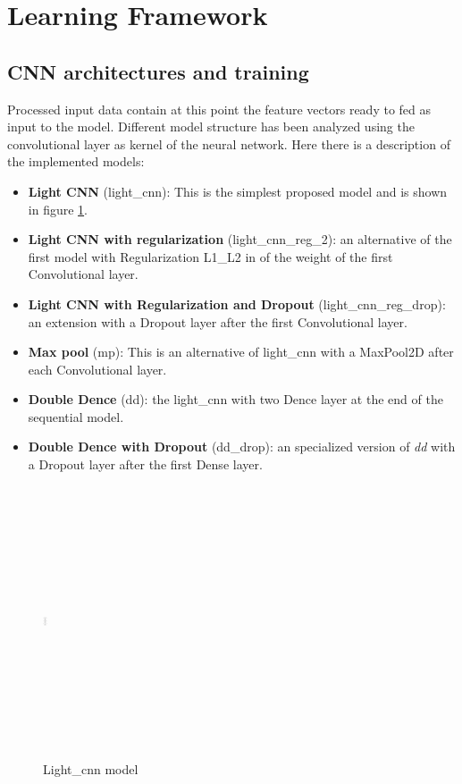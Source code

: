 \section{Learning Framework}
\label{sec:learning_framework}

\subsection*{\textbf {CNN architectures and training}}Processed input data contain at this point the feature vectors ready to fed as input to the model. Different model structure has been analyzed using the convolutional layer as kernel of the neural network. Here there is a description of the implemented models:
\begin{itemize}
	\item \textbf{Light CNN} (light\_cnn): This is the simplest proposed model and is shown in figure \ref{fig:CNN_schema}.
	\item \textbf{Light CNN with regularization} (light\_cnn\_reg\_2): an alternative of the first model with Regularization L1\_L2 in of the weight of the first Convolutional layer.
	\item \textbf{Light CNN with Regularization and Dropout} (light\_cnn\_reg\_drop): an extension with a Dropout layer after the first Convolutional layer.
	\item \textbf{Max pool} (mp): This is an alternative of light\_cnn with a MaxPool2D after each Convolutional layer.
	\item \textbf{Double Dence} (dd): the light\_cnn with two Dence layer at the end of the sequential model.
	\item \textbf{Double Dence with Dropout} (dd\_drop): an specialized version of \textit{dd} with a Dropout layer after the first Dense layer.
\end{itemize}
\begin{figure}[h]
	\centering
	\includegraphics[width=5, height=8cm, width=0.25\textwidth]{CNN_schema}
	\caption{Light\_cnn model}
	\label{fig:CNN_schema}
\end{figure} 
